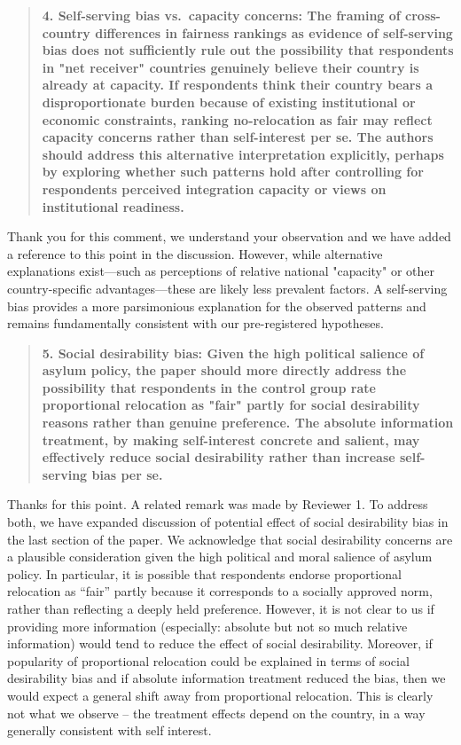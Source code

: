 \documentclass[
  11pt,
]{article}
\begin{document}
\begin{quote}
\textbf{4. Self-serving bias vs.~capacity concerns: The framing of cross-country differences in fairness rankings as evidence of self-serving bias does not sufficiently rule out the possibility that respondents in "net receiver" countries genuinely believe their country is already at capacity. If respondents think their country bears a disproportionate burden because of existing institutional or economic constraints, ranking no-relocation as fair may reflect capacity concerns rather than self-interest per se. The authors should address this alternative interpretation explicitly, perhaps by exploring whether such patterns hold after controlling for respondents\textquotesingle{} perceived integration capacity or views on institutional readiness.}
\end{quote}

Thank you for this comment, we understand your observation and we have
added a reference to this point in the discussion. However, while
alternative explanations exist---such as perceptions of relative
national "capacity" or other country-specific advantages---these are
likely less prevalent factors. A self-serving bias provides a more
parsimonious explanation for the observed patterns and remains
fundamentally consistent with our pre-registered hypotheses.

\begin{quote}
\textbf{5. Social desirability bias: Given the high political salience of asylum policy, the paper should more directly address the possibility that respondents in the control group rate proportional relocation as "fair" partly for social desirability reasons rather than genuine preference. The absolute information treatment, by making self-interest concrete and salient, may effectively reduce social desirability rather than increase self-serving bias per se.}
\end{quote}

Thanks for this point. A related remark was made by Reviewer 1. To address both, we have expanded discussion of potential effect of social desirability bias in the last section of the paper. We acknowledge that social desirability concerns are a plausible consideration given the high political and moral salience of asylum policy. In particular, it is possible that respondents endorse proportional relocation as ``fair'' partly because it corresponds to a socially approved norm, rather than reflecting a deeply held preference. However, it is not clear to us if providing more information (especially: absolute but not so much relative information) would tend to reduce the effect of social desirability. Moreover, if popularity of proportional relocation could be explained in terms of social desirability bias and if absolute information treatment reduced the bias, then we would expect a general shift away from proportional relocation. This is clearly not what we observe -- the treatment effects depend on the country, in a way generally consistent with self interest.
\end{document}
